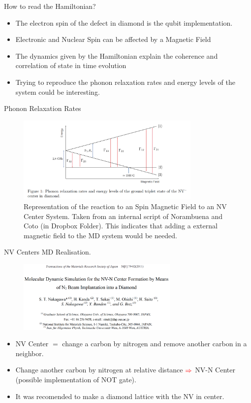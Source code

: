 \documentclass[11pt]{beamer}
\begin{document}
\begin{frame}{How to read the Hamiltonian?}
\begin{itemize}
    \item The electron spin of the defect in diamond is the qubit implementation.
    \item Electronic and Nuclear Spin can be affected by a Magnetic Field
    \item The dynamics given by the Hamiltonian explain the coherence and correlation of state in time evolution
    \item Trying to reproduce the phonon relaxation rates and energy levels of the system could be interesting.
\end{itemize}
\end{frame}
\begin{frame}{Phonon Relaxation Rates}
\begin{figure}
 \centering
    \includegraphics[width=0.8\textwidth]{phononic.png}
    \caption{Representation of the reaction to an Spin Magnetic Field to an NV Center System. Taken from an internal script of Norambuena and Coto (in Dropbox Folder). This indicates that adding a external magnetic field to the MD system would be needed.} 
 \end{figure}
\end{frame}
\begin{frame}{NV Centers MD Realisation.}
\begin{figure}
 \centering
    \includegraphics[width=0.7\textwidth]{pap0.png}
 \end{figure}
 \begin{itemize}
     \item NV Center $=$ change a carbon by nitrogen and remove another carbon in a neighbor.
     \item Change another carbon by nitrogen at relative distance $\textcolor{red}{\Rightarrow}$ NV-N Center (possible implementation of NOT gate).
     \item It was recomended to make a diamond lattice with the NV in center.
 \end{itemize}
 \end{frame}
\end{document}
